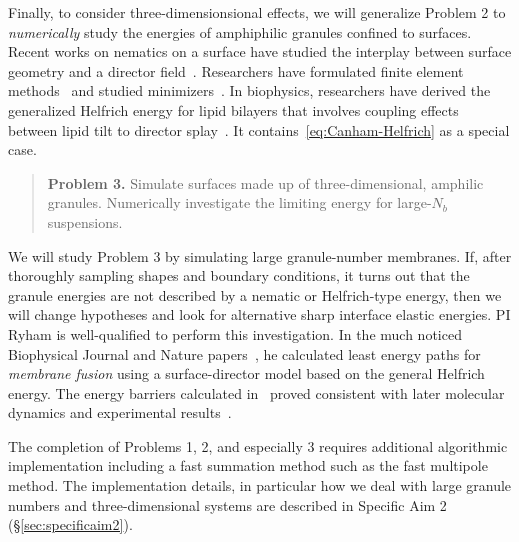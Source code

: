 Finally, to consider three-dimensionsional effects, we will generalize
Problem 2 to \emph{numerically} study the energies of amphiphilic
granules confined to surfaces. Recent works on nematics on a surface have
studied the interplay between surface geometry and a director
field~\cite{Nestler2020PropertiesOS, Nitschke2018NematicLC,
Nestler2018OrientationalOO, Nitschke2019HydrodynamicII,
Nitschke2020LiquidCO}. Researchers have formulated finite element
methods~\cite{Bartels2012FiniteEM, Nochetto2015NumericsFL,
Nestler2019AFE} and studied minimizers~\cite{Segatti2014EquilibriumCO,
Segatti2014AnalysisOA}. In biophysics, researchers
have derived the generalized Helfrich energy for lipid bilayers that
involves coupling effects between lipid tilt to director
splay~\cite{Hamm2000ElasticEO, Terzi2019CurvatureTiltTO, Terzi2019ACQ,
  Terzi2017NovelTC, Pinigin2020NewCT}. It contains~\eqref{eq:Canham-Helfrich}
as a special case.
\begin{quotation}
  \noindent
  \textbf{Problem 3.} Simulate surfaces made up of three-dimensional,
  amphilic granules. Numerically investigate the limiting energy for
  large-$N_b$ suspensions.
\end{quotation}
We will study Problem 3 by simulating large granule-number membranes.
If, after thoroughly sampling shapes and boundary conditions,
it turns out that the granule energies are not described by
a nematic or  Helfrich-type energy, then we will change
hypotheses and look for alternative sharp interface elastic energies.
PI Ryham is well-qualified to perform this investigation.
In the much noticed Biophysical Journal and Nature
papers~\cite{RyKlYaCo16, Chetal16}, he calculated least energy
paths for \emph{membrane fusion} using a surface-director model based on
the general Helfrich energy. The energy barriers calculated
in~\cite{RyKlYaCo16} proved consistent with later molecular dynamics and
experimental results~\cite{SmRiMu19, 2017PNAS..114.1238F}.

The completion of Problems 1, 2, and especially 3 requires additional
algorithmic implementation including a fast summation method such as the
fast multipole method. The implementation details, in particular how we
deal with large granule numbers and three-dimensional systems are
described in Specific Aim 2 (\S\ref{sec:specificaim2}).




